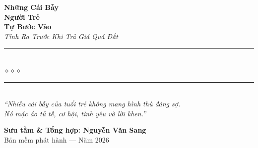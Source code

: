 \begin{titlepage}
\begin{center}
  {\fontsize{28}{34}\selectfont\bfseries\color{trapgreen!80!black}
    Những Cái Bẫy}\\[0.4cm]
  {\fontsize{28}{34}\selectfont\bfseries\color{trapgold!80!black}
    Người Trẻ}\\[0.4cm]
  {\fontsize{28}{34}\selectfont\bfseries\color{trapgreen!80!black}
    Tự Bước Vào}\\[0.4cm]

  {\fontsize{16}{20}\selectfont\color{trapgold!90!black}\itshape
    Tỉnh Ra Trước Khi Trả Giá Quá Đắt}\\[1cm]

  {\color{trapbrown!60}\rule{6cm}{1pt}}\\[5pt]
  {\color{trapgold!80!black}\large$\diamond$\hspace{1cm}$\diamond$\hspace{1cm}$\diamond$}\\[5pt]
  {\color{trapbrown!60}\rule{6cm}{1pt}}\\[1.5cm]

  {\normalsize\itshape\color{trapbrown!90!black}
   ``Nhiều cái bẫy của tuổi trẻ không mang hình thù đáng sợ.\\
   Nó mặc áo tử tế, cơ hội, tình yêu và lời khen.''}

  \vfill

  {\fontsize{16}{20}\selectfont\bfseries\color{trapbrown!90!black}
    Sưu tầm \& Tổng hợp: \textbf{Nguyễn Văn Sang}}\\[0.4cm]

  {\small\color{gray} Bản mềm phát hành --- Năm 2026}\\[0.5cm]
\end{center}

\afterpage{\nopagecolor}
\end{titlepage}